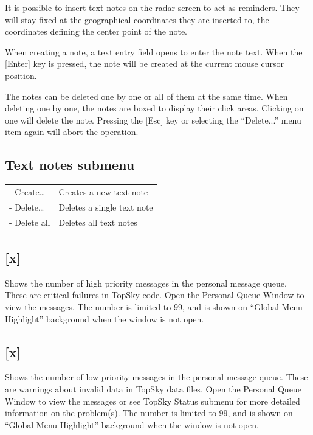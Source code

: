 \documentclass[11pt,a4paper]{memoir}
\begin{document}
It is possible to insert text notes on the radar screen to act as reminders. They will stay fixed at the geographical coordinates they are inserted to, the coordinates defining the center point of the note.

When creating a note, a text entry field opens to enter the note text. When the [Enter] key is pressed, the note will be created at the current mouse cursor position.

The notes can be deleted one by one or all of them at the same time. When deleting one by one, the notes are boxed to display their click areas. Clicking on one will delete the note. Pressing the [Esc] key or selecting the “Delete...” menu item again will abort the operation.

\subsection*{Text notes submenu}

\begin{tabular}{l l}
\\- Create…     & Creates a new text note
\\- Delete…     & Deletes a single text note
\\- Delete all  & Deletes all text notes
\end{tabular}

\subsection{[x]}

Shows the number of high priority messages in the personal message queue. These are critical failures in TopSky code. Open the Personal Queue Window to view the messages. The number is limited to 99, and is shown on “Global Menu Highlight” background when the window is not open. 
\subsection{[x]}

Shows the number of low priority messages in the personal message queue. These are warnings about invalid data in TopSky data files. Open the Personal Queue Window to view the messages or see TopSky Status submenu for more detailed information on the problem(s). The number is limited to 99, and is shown on “Global Menu Highlight” background when the window is not open. 
\end{document}
